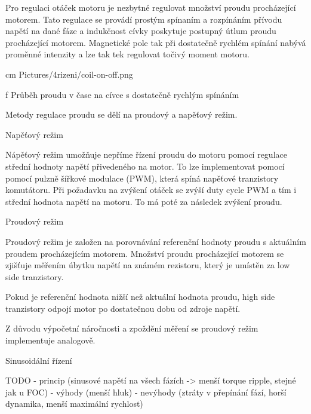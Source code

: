     Pro regulaci otáček motoru je nezbytné regulovat množství proudu procházející motorem.
    Tato regulace se provádí prostým spínaním a rozpínáním přívodu napětí na dané fáze a indukčnost 
    cívky poskytuje postupný útlum proudu procházející motorem. Magnetické pole tak při dostatečně 
    rychlém spínání nabývá proměnné intenzity a lze tak tek regulovat točivý moment motoru.

    \medskip
     cm \cinspic Pictures/4rizeni/coil-on-off.png 
    \caption/f Průběh proudu v čase na cívce s dostatečně rychlým spínáním
    \medskip

    Metody regulace proudu se dělí na proudový a napěťový režim. 
    
    \secc Napěťový režim

    Nápěťový režim umožňuje nepříme řízení proudu do motoru pomocí regulace střední hodnoty napětí přivedeného na motor.
    To lze implementovat pomocí pomocí pulzně šířkové modulace (PWM), která spíná napěťové tranzistory komutátoru.
    Při požadavku na zvýšení otáček se zvýší duty cycle PWM a tím i střední hodnota napětí na motoru.
    To má poté za následek zvýšení proudu.
    

    \secc Proudový režim

    Proudový režim je založen na porovnávání referenční hodnoty proudu s aktuálním proudem procházejícím motorem.
    Množství proudu procházející motorem se zjišťuje měřením úbytku napětí na známém rezistoru, který je umístěn za low side tranzistory.

    Pokud je referenční hodnota nižší než aktuální hodnota proudu, high side tranzistory odpojí motor po dostatečnou dobu od zdroje napětí.

    Z důvodu výpočetní náročnosti a zpoždění měření se proudový režim implementuje analogově.
    
\sec Sinusoidální řízení

    TODO
    - princip (sinusové napětí na všech fázích -> menší torque ripple, stejné jak u FOC)  
    - výhody (menší hluk)
    - nevýhody (ztráty v přepínání fází, horší dynamika, menší maximální rychlost)

